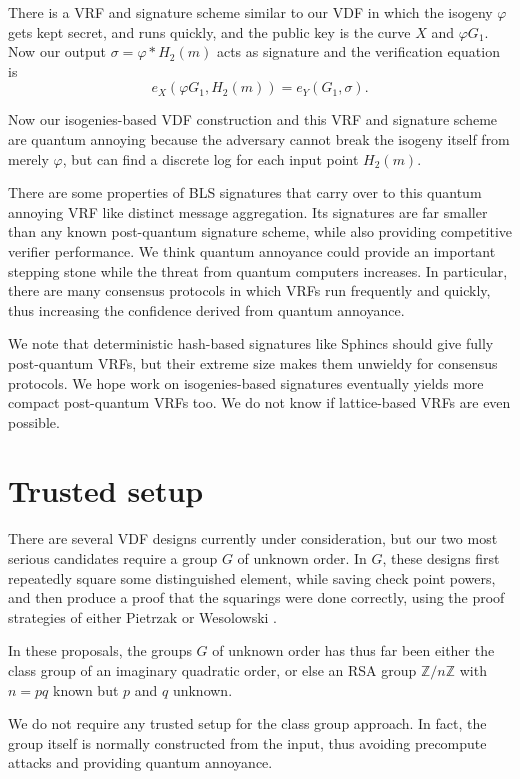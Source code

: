 \documentclass{article}
\newcommand{\Z}{\mathbb{Z}}
\newcommand\mathperiod{.}
\begin{document}
There is a VRF and signature scheme similar to our VDF in which the
isogeny $φ$ gets kept secret, and runs quickly, and the public key
is the curve $X$ and $φ G_1$.  Now our output $\sigma = φ* H_2(m)$
acts as signature and the verification equation is 
$$ e_X( φ G_1, H_2(m) ) = e_Y( G_1, \sigma ) \mathperiod $$

Now our isogenies-based VDF construction and this VRF and signature
scheme are quantum annoying because the adversary cannot break the
isogeny itself from merely $φ$, but can find a discrete log for each
input point $H_2(m)$.

There are some properties of BLS signatures that carry over to this
quantum annoying VRF like distinct message aggregation.  
Its signatures are far smaller than any known post-quantum signature
scheme, while also providing competitive verifier performance.  
We think quantum annoyance could provide an important stepping stone
while the threat from quantum computers increases.  In particular,
there are many consensus protocols in which VRFs run frequently and
quickly, thus increasing the confidence derived from quantum annoyance.  

We note that deterministic hash-based signatures like Sphincs should
give fully post-quantum VRFs, but their extreme size makes them
unwieldy for consensus protocols.  We hope work on isogenies-based
signatures eventually yields more compact post-quantum VRFs too.
We do not know if lattice-based VRFs are even possible.


\section{Trusted setup}

There are several VDF designs currently under consideration, but
our two most serious candidates require a group $G$ of unknown order.
In $G$, these designs first repeatedly square some distinguished
element, while saving check point powers, and then produce a proof
that the squarings were done correctly, using the proof strategies
of either Pietrzak \cite{Pietrzak} or Wesolowski \cite{Wesolowski}.

In these proposals, the groups $G$ of unknown order has thus far been
either the class group of an imaginary quadratic order, or else an
RSA group $\Z/n\Z$ with $n = p q$ known but $p$ and $q$ unknown.

We do not require any trusted setup for the class group approach.
In fact, the group itself is normally constructed from the input,
thus avoiding precompute attacks and providing quantum annoyance.  
\end{document}

